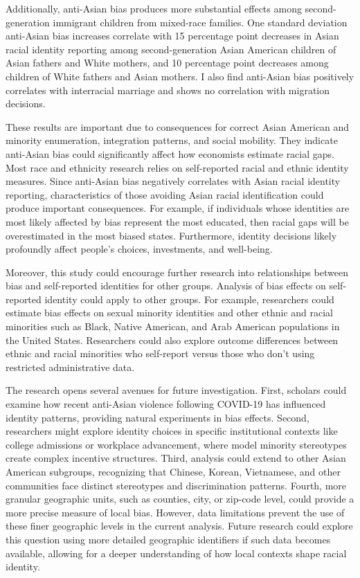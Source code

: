 Additionally, anti-Asian bias produces more substantial effects among second-generation immigrant children from mixed-race families. One standard deviation anti-Asian bias increases correlate with 15 percentage point decreases in Asian racial identity reporting among second-generation Asian American children of Asian fathers and White mothers, and 10 percentage point decreases among children of White fathers and Asian mothers. I also find anti-Asian bias positively correlates with interracial marriage and shows no correlation with migration decisions.

These results are important due to consequences for correct Asian American and minority enumeration, integration patterns, and social mobility. They indicate anti-Asian bias could significantly affect how economists estimate racial gaps. Most race and ethnicity research relies on self-reported racial and ethnic identity measures. Since anti-Asian bias negatively correlates with Asian racial identity reporting, characteristics of those avoiding Asian racial identification could produce important consequences. For example, if individuals whose identities are most likely affected by bias represent the most educated, then racial gaps will be overestimated in the most biased states. Furthermore, identity decisions likely profoundly affect people's choices, investments, and well-being.

Moreover, this study could encourage further research into relationships between bias and self-reported identities for other groups. Analysis of bias effects on self-reported identity could apply to other groups. For example, researchers could estimate bias effects on sexual minority identities and other ethnic and racial minorities such as Black, Native American, and Arab American populations in the United States. Researchers could also explore outcome differences between ethnic and racial minorities who self-report versus those who don't using restricted administrative data.

The research opens several avenues for future investigation. First, scholars could examine how recent anti-Asian violence following COVID-19 has influenced identity patterns, providing natural experiments in bias effects. Second, researchers might explore identity choices in specific institutional contexts like college admissions or workplace advancement, where model minority stereotypes create complex incentive structures. Third, analysis could extend to other Asian American subgroups, recognizing that Chinese, Korean, Vietnamese, and other communities face distinct stereotypes and discrimination patterns. Fourth, more granular geographic units, such as counties, city, or zip-code level, could provide a more precise measure of local bias. However, data limitations prevent the use of these finer geographic levels in the current analysis. Future research could explore this question using more detailed geographic identifiers if such data becomes available, allowing for a deeper understanding of how local contexts shape racial identity.

